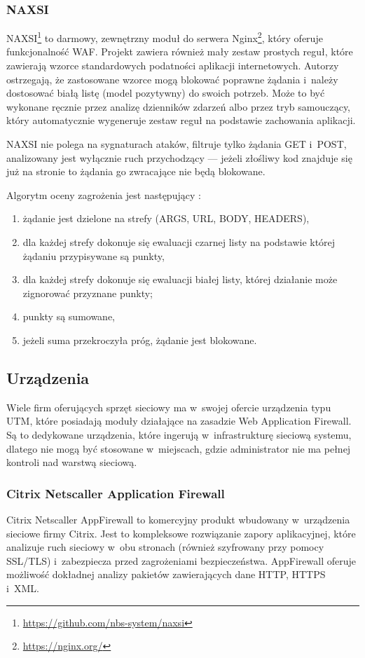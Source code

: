 \documentclass[12pt,a4paper,polish,thesis]{dcsbook}
\begin{document}
\subsubsection{NAXSI}
NAXSI\footnote{\url{https://github.com/nbs-system/naxsi}} to darmowy, zewnętrzny moduł do serwera Nginx\footnote{\url{https://nginx.org/}}, który oferuje funkcjonalność WAF. Projekt zawiera również mały zestaw prostych reguł, które zawierają wzorce standardowych podatności aplikacji internetowych. Autorzy ostrzegają, że zastosowane wzorce mogą blokować poprawne żądania i~należy dostosować białą listę (model pozytywny) do swoich potrzeb. Może to być wykonane ręcznie przez analizę dzienników zdarzeń albo przez tryb samouczący, który automatycznie wygeneruje zestaw reguł na podstawie zachowania aplikacji.

NAXSI nie polega na sygnaturach ataków, filtruje tylko żądania GET i~POST, analizowany jest wyłącznie ruch przychodzący --- jeżeli złośliwy kod znajduje się już na stronie to żądania go zwracające nie będą blokowane.

Algorytm oceny zagrożenia jest następujący \cite{naxsi-sekurak}:
\begin{enumerate}
\item żądanie jest dzielone na strefy (ARGS, URL, BODY, HEADERS),
\item dla każdej strefy dokonuje się ewaluacji czarnej listy na podstawie której żądaniu przypisywane są punkty,
\item dla każdej strefy dokonuje się ewaluacji białej listy, której działanie może zignorować przyznane punkty;
\item punkty są sumowane,
\item jeżeli suma przekroczyła próg, żądanie jest blokowane.
\end{enumerate}

\subsection{Urządzenia}
Wiele firm oferujących sprzęt sieciowy ma w~swojej ofercie urządzenia typu UTM, które posiadają moduły działające na zasadzie Web Application Firewall. Są to dedykowane urządzenia, które ingerują w~infrastrukturę sieciową systemu, dlatego nie mogą być stosowane w~miejscach, gdzie administrator nie ma pełnej kontroli nad warstwą sieciową.

\subsubsection{Citrix Netscaller Application Firewall}
Citrix Netscaller AppFirewall \cite{citrix} to komercyjny produkt wbudowany w~urządzenia sieciowe firmy Citrix. Jest to kompleksowe rozwiązanie zapory aplikacyjnej, które analizuje ruch sieciowy w~obu stronach (również szyfrowany przy pomocy SSL/TLS) i~zabezpiecza przed zagrożeniami bezpieczeństwa. AppFirewall oferuje możliwość dokładnej analizy pakietów zawierających dane HTTP, HTTPS i~XML.
\end{document}
